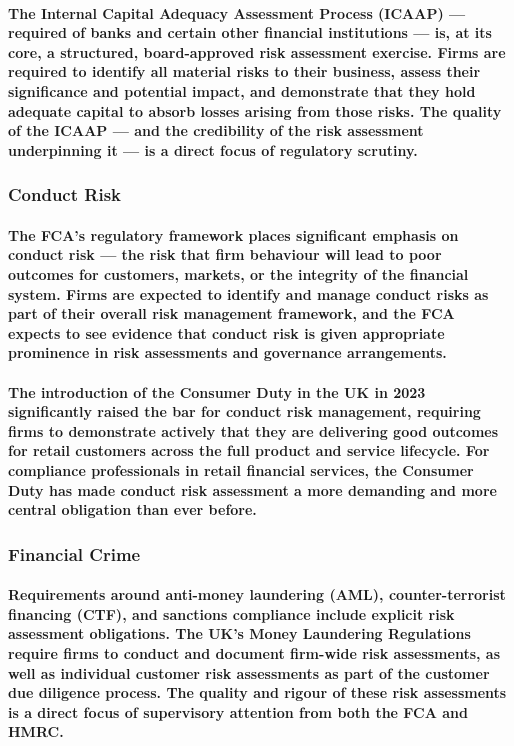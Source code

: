 \paragraph{The \textbf{Internal Capital Adequacy Assessment Process (ICAAP)} — required of banks and certain other financial institutions — is, at its core, a structured, board-approved risk assessment exercise. Firms are required to identify all material risks to their business, assess their significance and potential impact, and demonstrate that they hold adequate capital to absorb losses arising from those risks. The quality of the ICAAP — and the credibility of the risk assessment underpinning it — is a direct focus of regulatory scrutiny.}

\subsubsection{Conduct Risk}
\paragraph{The FCA's regulatory framework places significant emphasis on \textbf{conduct risk} — the risk that firm behaviour will lead to poor outcomes for customers, markets, or the integrity of the financial system. Firms are expected to identify and manage conduct risks as part of their overall risk management framework, and the FCA expects to see evidence that conduct risk is given appropriate prominence in risk assessments and governance arrangements.}
\paragraph{The introduction of the \textbf{Consumer Duty} in the UK in 2023 significantly raised the bar for conduct risk management, requiring firms to demonstrate actively that they are delivering good outcomes for retail customers across the full product and service lifecycle. For compliance professionals in retail financial services, the Consumer Duty has made conduct risk assessment a more demanding and more central obligation than ever before.}

\subsubsection{Financial Crime}
\paragraph{Requirements around \textbf{anti-money laundering (AML), counter-terrorist financing (CTF), and sanctions compliance} include explicit risk assessment obligations. The UK's Money Laundering Regulations require firms to conduct and document firm-wide risk assessments, as well as individual customer risk assessments as part of the customer due diligence process. The quality and rigour of these risk assessments is a direct focus of supervisory attention from both the FCA and HMRC.}
